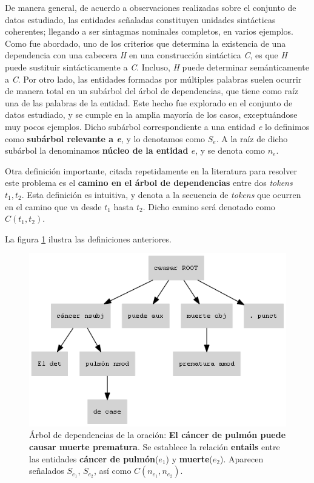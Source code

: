 De manera general, de acuerdo a observaciones realizadas sobre el conjunto de datos estudiado, las entidades señaladas constituyen unidades sintácticas coherentes; llegando a ser sintagmas nominales completos, en varios ejemplos.
Como fue abordado, uno de los criterios que determina la existencia de una dependencia con una cabecera \textit{H} en una construcción sintáctica \textit{C}, es que \textit{H} puede sustituir sintácticamente a \textit{C}.
Incluso, \textit{H} puede determinar semánticamente a \textit{C}.
Por otro lado, las entidades formadas por múltiples palabras suelen ocurrir de manera total en un subárbol del árbol de dependencias, que tiene como raíz una de las palabras de la entidad.
Este hecho fue explorado en el conjunto de datos estudiado, y se cumple en la amplia mayoría de los casos, exceptuándose muy pocos ejemplos.
Dicho subárbol correspondiente a una entidad \textit{e} lo definimos como \textbf{subárbol relevante a \textit{e}}, y lo denotamos como $S_e$.
A la raíz de dicho subárbol la denominamos \textbf{núcleo de la entidad $e$}, y se denota como $n_e$.

Otra definición importante, citada repetidamente en la literatura para resolver este problema es el \textbf{camino en el árbol de dependencias} entre dos \textit{tokens} $t_1,t_2$.
Esta definición es intuitiva, y denota a la secuencia de \textit{tokens} que ocurren en el camino que va desde $t_1$ hasta $t_2$.
Dicho camino será denotado como $C(t_1,t_2)$.

La figura \ref{fig:dep_tree_ex} ilustra las definiciones anteriores.

\begin{figure}[h!]
	\centering
	\includegraphics[width=0.7\linewidth]{Graphics/dep_tree_ex.png}
	\caption{Árbol de dependencias de la oración: \textbf{El cáncer de pulmón puede causar muerte prematura}. Se establece la relación \textbf{entails} entre las entidades \textbf{cáncer de pulmón}($e_1$) y \textbf{muerte}($e_2$). Aparecen señalados $S_{e_1}$, $S_{e_2}$, así como $C(n_{e_1}, n_{e_2})$.}\label{fig:dep_tree_ex}
\end{figure}

